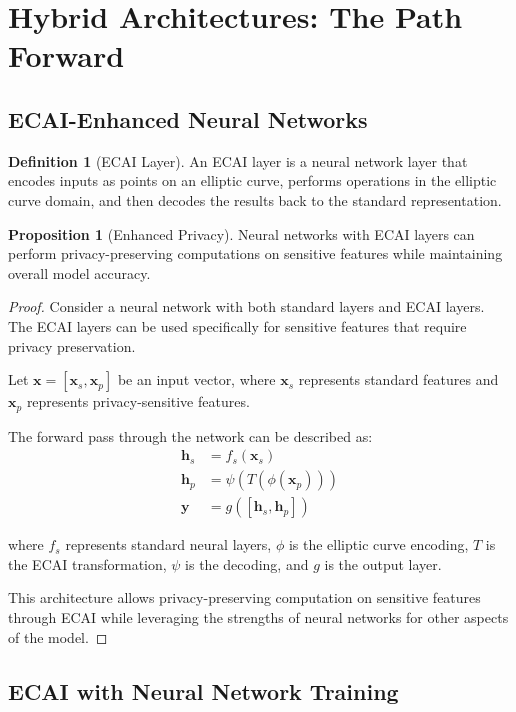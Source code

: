 \documentclass[12pt,a4paper]{article}
\theoremstyle{definition}
\newtheorem{definition}[theorem]{Definition}
\newtheorem{proposition}[theorem]{Proposition}
\begin{document}
\section{Hybrid Architectures: The Path Forward}

\subsection{ECAI-Enhanced Neural Networks}

\begin{definition}[ECAI Layer]
An ECAI layer is a neural network layer that encodes inputs as points on an elliptic curve, performs operations in the elliptic curve domain, and then decodes the results back to the standard representation.
\end{definition}

\begin{proposition}[Enhanced Privacy]
Neural networks with ECAI layers can perform privacy-preserving computations on sensitive features while maintaining overall model accuracy.
\end{proposition}

\begin{proof}
Consider a neural network with both standard layers and ECAI layers. The ECAI layers can be used specifically for sensitive features that require privacy preservation.

Let $\mathbf{x} = [\mathbf{x}_s, \mathbf{x}_p]$ be an input vector, where $\mathbf{x}_s$ represents standard features and $\mathbf{x}_p$ represents privacy-sensitive features.

The forward pass through the network can be described as:
\begin{align}
\mathbf{h}_s &= f_s(\mathbf{x}_s) \\
\mathbf{h}_p &= \psi(T(\phi(\mathbf{x}_p))) \\
\mathbf{y} &= g([\mathbf{h}_s, \mathbf{h}_p])
\end{align}

where $f_s$ represents standard neural layers, $\phi$ is the elliptic curve encoding, $T$ is the ECAI transformation, $\psi$ is the decoding, and $g$ is the output layer.

This architecture allows privacy-preserving computation on sensitive features through ECAI while leveraging the strengths of neural networks for other aspects of the model.
\end{proof}

\subsection{ECAI with Neural Network Training}
\end{document}
